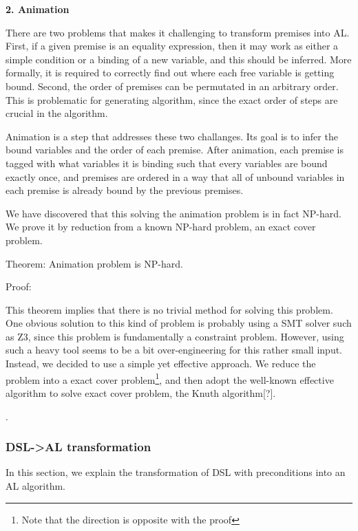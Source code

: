 

\textbf{2. Animation}

There are two problems that makes it challenging to transform premises into AL.
First, if a given premise is an equality expression, then it may work as either a simple condition or
a binding of a new variable, and this should be inferred. More formally, it is required to
correctly find out where each free variable is getting bound. Second, the order
of premises can be permutated in an arbitrary order. This is problematic for
generating algorithm, since the exact order of steps are crucial in the algorithm.

Animation is a step that addresses these two challanges. Its goal is to infer
the bound variables and the order of each premise.
After animation, each premise is tagged with what variables it is binding
such that every variables are bound exactly once, and premises are ordered in a way that
all of unbound variables in each premise is already bound by the previous premises.

We have discovered that this solving the animation problem is in fact NP-hard.
We prove it by reduction from a known NP-hard problem, an exact cover problem.

Theorem: Animation problem is NP-hard.

Proof: 

This theorem implies that there is no trivial method for solving this problem.
One obvious solution to this kind of problem is probably using a SMT solver such as Z3, since
this problem is fundamentally a constraint problem.
However, using such a heavy tool seems to be a bit over-engineering for this rather small input.
Instead, we decided to use a simple yet effective approach.
We reduce the problem into a exact cover problem\footnote{Note that the direction is opposite with
the proof}, and then adopt the well-known effective algorithm to solve exact cover problem,
the Knuth algorithm[?].

.


\subsubsection{DSL->AL transformation}

In this section, we explain the transformation of DSL with preconditions into an AL algorithm.

